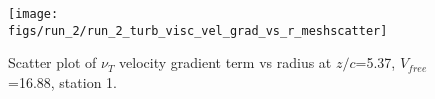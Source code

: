 \begin{figure}[H]
\centering
\texttt{[image: figs/run\_2/run\_2\_turb\_visc\_vel\_grad\_vs\_r\_meshscatter]}
\caption{Scatter plot of $\nu_T$ velocity gradient term vs radius at $z/c$=5.37, $V_{free}$=16.88, station 1.}
\label{fig:run_2_turb_visc_vel_grad_vs_r_meshscatter}
\end{figure}


